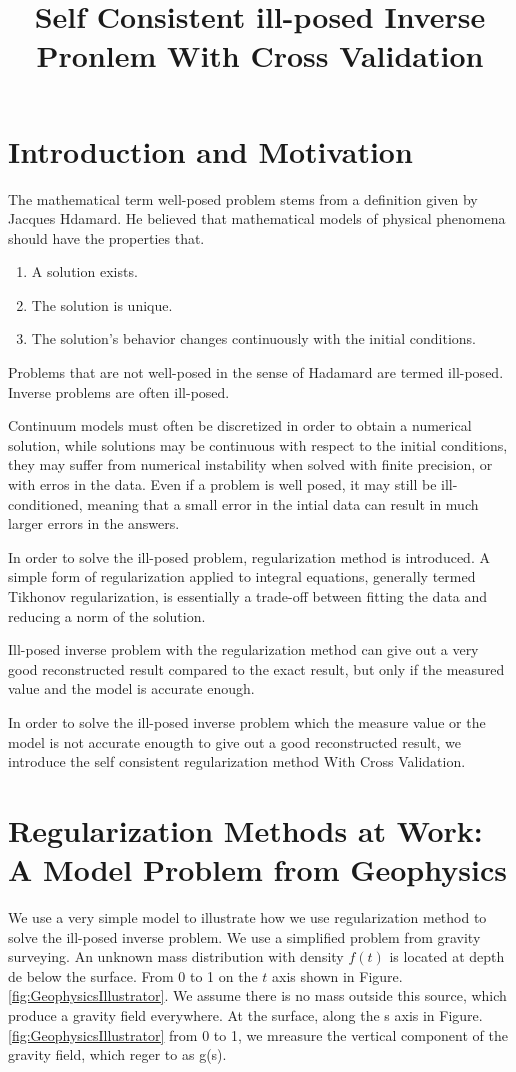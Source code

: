 \documentclass{article}
\begin{document}
\title{Self Consistent ill-posed Inverse Pronlem With Cross Validation}
\maketitle

\section{Introduction and Motivation}
The mathematical term well-posed problem stems from a definition given by
Jacques Hdamard. He believed that mathematical models of physical phenomena
should have the properties that.
\begin{enumerate} 
  \item A solution exists.
  \item The solution is unique.
  \item The solution's behavior changes continuously with the initial
  conditions.
\end{enumerate}
Problems that are not well-posed in the sense
of Hadamard are termed ill-posed. Inverse problems are often ill-posed.

Continuum models must often be discretized in order to obtain a numerical
solution, while solutions may be continuous with respect to the initial
conditions, they may suffer from numerical instability when solved with finite
precision, or with erros in the data. Even if a problem is well posed, it may
still be ill-conditioned, meaning that a small error in the intial data can
result in much larger errors in the answers.

In order to solve the ill-posed problem, regularization method is introduced. A
simple form of regularization applied to integral equations, generally termed
Tikhonov regularization, is essentially a trade-off between fitting the data and
reducing a norm of the solution. 

Ill-posed inverse problem with the regularization method can give out a very
good reconstructed result compared to the exact result, but only if the measured
value and the model is accurate enough.

In order to solve the ill-posed inverse problem which the measure value or the 
model is not accurate enougth to give out a good reconstructed result, we
introduce the self consistent regularization method With Cross Validation.

\section{Regularization Methods at Work: A Model Problem from Geophysics}
We use a very simple model to illustrate how we use regularization method to
solve the ill-posed inverse problem. We use a simplified problem from gravity
surveying. An unknown mass distribution with density \(f(t)\) is located at
depth de below the surface. From 0 to 1 on the \(t\) axis shown in
Figure. \ref{fig:GeophysicsIllustrator}. We assume there is no mass outside
this source, which produce a gravity field everywhere. At the surface, along the
s axis in Figure. \ref{fig:GeophysicsIllustrator} from 0 to 1, we mreasure the
vertical component of the gravity field, which reger to as g(s).
 
\end{document}
